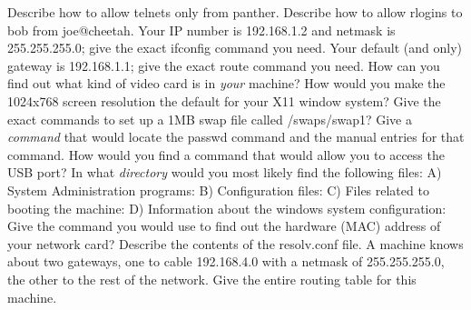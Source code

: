 \vskip 0.8in
\ques
Describe how to allow telnets only from {\ltt{}panther}.
\vskip 0.9in
Describe how to allow rlogins to {\ltt{}bob} from {\ltt{}joe@cheetah}.
\vskip 1.1in
Your IP number is 192.168.1.2 and netmask is 255.255.255.0;
give the exact {\ltt{}ifconfig} command you need.
\vskip 0.4in
Your default (and only) gateway is 192.168.1.1;
give the exact {\ltt{}route} command you need.
\vskip 0.4in
\ques
How can you find out what kind of video card is in {\it your} machine?
\vskip 1.6in
How would you make the 1024x768 screen resolution the default
for your X11 window system?
\vskip 1.2in
\vfill\eject
\ques
Give the exact commands to set up a 1MB swap file called {\ltt{}/swaps/swap1}?
\vskip 1.5in
\ques
\hfill\break
Give a {\it command} that would locate the passwd command and the
manual entries for that command.
\vskip 0.4in
How would you find a command that would allow you to access the USB port?
\vskip 0.4in
In what {\it directory} would you most likely find
the following files:
\hfill\break
A) System Administration programs:
\vskip 0.2in
B) Configuration files:
\vskip 0.2in
C) Files related to booting the machine:
\vskip 0.2in
D) Information about the windows system configuration:
\vskip 0.2in
\ques
Give the command you would use to find out
the hardware (MAC) address of your network card?
\vskip 0.4in
Describe the contents of the {\ltt{}resolv.conf} file.
\vskip 1.2in
A machine knows about two gateways, one to cable {\ltt{}192.168.4.0}
with a netmask of {\ltt{}255.255.255.0}, the other to the
rest of the network.
Give the entire routing table for this machine.
\vskip 2.0in
\bye

